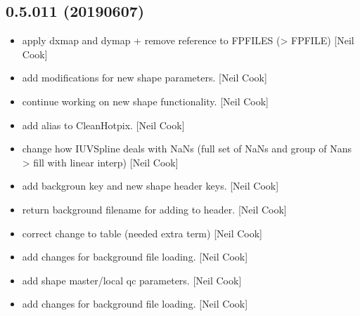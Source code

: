 \documentclass[a4paper,10pt,english]{report}
\begin{document}
\subsection{0.5.011 (2019\sphinxhyphen{}06\sphinxhyphen{}07)}
\label{\detokenize{misc/changelog:id144}}\begin{itemize}
\item {} 
 \sphinxhyphen{} apply dxmap and dymap + remove reference to
FPFILES (\textendash{}\textgreater{} FPFILE) {[}Neil Cook{]}

\item {} 
 \sphinxhyphen{} add modifications for new shape parameters. {[}Neil
Cook{]}

\item {} 
 \sphinxhyphen{} continue working on new shape functionality. {[}Neil
Cook{]}

\item {} 
 \sphinxhyphen{} add alias to CleanHotpix. {[}Neil Cook{]}

\item {} 
 \sphinxhyphen{} change how IUVSpline deals with NaNs (full set of NaNs
and group of Nans \textendash{}\textgreater{} fill with linear interp) {[}Neil Cook{]}

\item {} 
 \sphinxhyphen{} add backgroun key and new shape header keys. {[}Neil
Cook{]}

\item {} 
 \sphinxhyphen{} return background filename for adding to header. {[}Neil
Cook{]}

\item {} 
 \sphinxhyphen{} correct change to table (needed extra term)
{[}Neil Cook{]}

\item {} 
 \sphinxhyphen{} add changes for background file loading.
{[}Neil Cook{]}

\item {} 
 \sphinxhyphen{} add shape master/local qc parameters. {[}Neil
Cook{]}

\item {} 
 \sphinxhyphen{} add changes for background file loading. {[}Neil
Cook{]}


\end{itemize}
\end{document}

